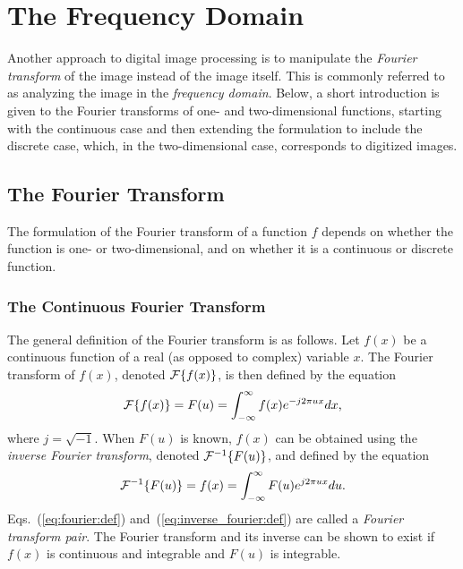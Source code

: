 
\section{The Frequency Domain}
\label{image:frequency}

Another approach to digital image processing is to manipulate the {\em
  Fourier transform\/} of the image instead of the image itself.  This
is commonly referred to as analyzing the image in the {\em frequency
  domain\/}.  Below, a short introduction is given to the Fourier
transforms of one- and two-dimensional functions, starting with the
continuous case and then extending the formulation to include the
discrete case, which, in the two-dimensional case, corresponds to
digitized images.

\subsection{The Fourier Transform}
\label{image:frequency:fourier}

The formulation of the Fourier transform of a function $f$ depends on
whether the function is one- or two-dimensional, and on whether it is
a continuous or discrete function.

\subsubsection{The Continuous Fourier Transform}

The general definition of the Fourier transform is as follows.  Let
$f(x)$ be a continuous function of a real (as opposed to complex)
variable $x$.  The Fourier transform of $f(x)$, denoted ${\cal
  F}\{f(x)\}$, is then defined by the equation
\begin{equation}
\label{eq:fourier:def}
{\cal F}\{f(x)\}=F(u)=\int_{-\infty}^{\infty}f(x)e^{-j2\pi
  ux}dx\mbox{,}
\end{equation}
where $j=\sqrt{-1}$.  When $F(u)$ is known, $f(x)$ can be obtained
using the {\em inverse Fourier transform\/}, denoted ${\cal
  F}^{-1}\{F(u)\}$, and defined by the equation
\begin{equation}
\label{eq:inverse_fourier:def}
{\cal F}^{-1}\{F(u)\}=f(x)=\int_{-\infty}^{\infty}F(u)e^{j2\pi
  ux}du\mbox{.}
\end{equation}
Eqs.~(\ref{eq:fourier:def}) and~(\ref{eq:inverse_fourier:def}) are
called a {\em Fourier transform pair\/}.  The Fourier transform and
its inverse can be shown to exist if $f(x)$ is continuous and
integrable and $F(u)$ is integrable.

